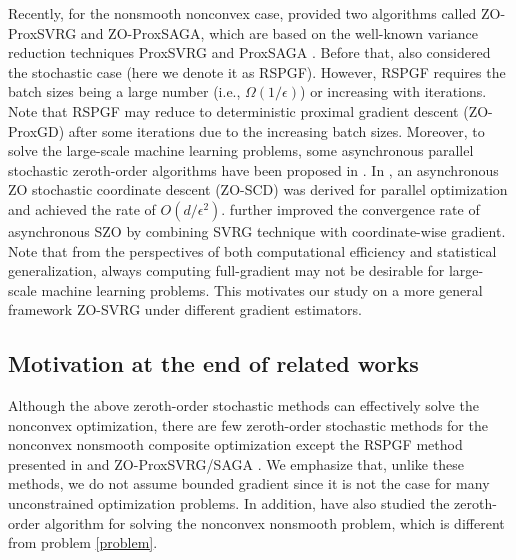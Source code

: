 \documentclass{article}
\theoremstyle{definition}
\theoremstyle{remark}
\begin{document}
{{{{\color{Violet}
Recently, for the nonsmooth nonconvex case, \cite{huang2019faster} provided two algorithms called ZO-ProxSVRG and ZO-ProxSAGA, which are based on the well-known variance reduction techniques ProxSVRG and ProxSAGA \cite{reddi2016proximal}. Before that,  \cite{ghadimi2016accelerated} also considered the stochastic case (here we denote
it as RSPGF). However, RSPGF requires the batch sizes being a large number (i.e., $\Omega(1/\epsilon)$) or increasing with
iterations. Note that RSPGF may reduce to deterministic proximal gradient descent (ZO-ProxGD) after some iterations due to the
increasing batch sizes.
}
Moreover, to solve the large-scale machine learning problems, some asynchronous parallel stochastic zeroth-order algorithms have been proposed in \cite{gu2018inexact,lian2016comprehensive,gu2018faster}.
}
In \cite{lian2016comprehensive}, an asynchronous ZO stochastic coordinate
descent (ZO-SCD) was derived for parallel optimization and achieved the rate of $O(d/\epsilon^2)$.
{\color{YellowOrange} \cite{gu2018faster} further improved the convergence rate of
asynchronous SZO by combining SVRG technique with coordinate-wise gradient. }
{\color{Violet} Note that from the perspectives of both computational efficiency and statistical generalization, always computing full-gradient may not be desirable for large-scale machine learning problems.} This motivates our study on a more general framework ZO-SVRG under different gradient estimators.
}

\subsection{Motivation at the end of related works}
Although the above zeroth-order stochastic methods can effectively solve the nonconvex optimization, there are few zeroth-order stochastic methods for the nonconvex nonsmooth composite optimization except the RSPGF method presented in \cite{ghadimi2016accelerated} and ZO-ProxSVRG/SAGA \cite{huang2019faster}. We emphasize that, unlike these methods, we do not assume  bounded gradient since it is not the case for many unconstrained optimization problems. In addition, \cite{liu2018stochastic} have also studied the zeroth-order algorithm for solving the nonconvex nonsmooth problem, which is different from problem \eqref{problem}.
}
\end{document}
